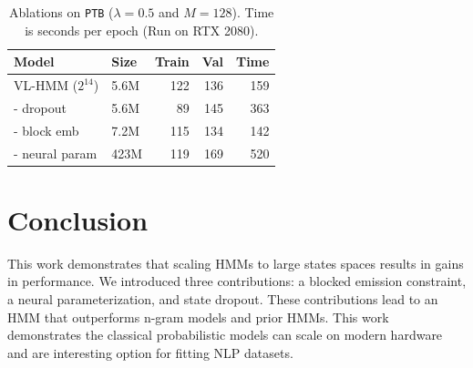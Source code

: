 \documentclass[11pt,a4paper]{article}
\begin{document}
\begin{table}[!t]
\centering
\begin{tabular}{llrrr}
\toprule
Model                           & Size & Train  & Val  &  Time \\
\midrule
VL-HMM ($2^{14}$)       & 5.6M       & 122    & 136  & 159\\
\quad - dropout              & 5.6M       & 89     & 145  & 363\\
\quad - block emb & 7.2M     & 115    & 134  & 142\\
\quad - neural param & 423M  & 119    & 169 & 520
\\
\bottomrule
\end{tabular}
\caption{\label{tbl:dropout-param-ablation}
Ablations on \texttt{PTB} ($\lambda =0.5$ and $M=128$). 
Time is seconds per epoch (Run on RTX 2080).
}
\end{table}


\section{Conclusion}
This work demonstrates that scaling HMMs to large states spaces results in gains in performance. We introduced three contributions: a blocked emission constraint, a neural parameterization, and state dropout. These contributions lead to an HMM that outperforms n-gram models and prior HMMs. This work demonstrates the classical probabilistic models can scale on modern hardware and are interesting option for fitting NLP datasets. 
\end{document}
